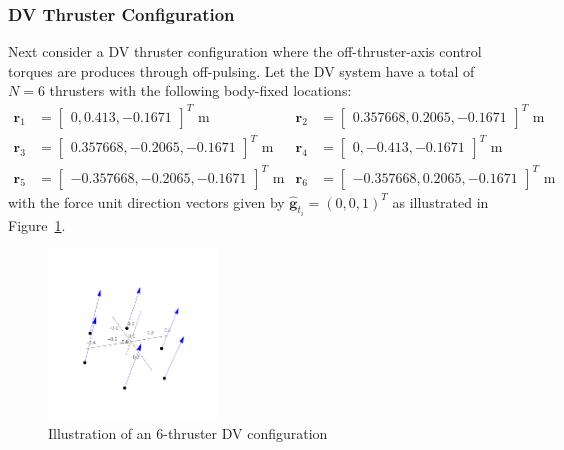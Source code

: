 \subsubsection{DV Thruster Configuration}
Next consider a DV thruster configuration where the off-thruster-axis control torques are produces through off-pulsing.  Let the DV system have a total of $N = 6$ thrusters with the following body-fixed locations:
\begin{align*}
	\label{eq:th:loc}
	\bm r_{1} &= \begin{bmatrix} 0, 0.413, -0.1671  \end{bmatrix}^{T} \text{ m}
	& 
	\bm r_{2} &= \begin{bmatrix} 0.357668, 0.2065, -0.1671  \end{bmatrix}^{T} \text{ m}
	\\
	\bm r_{3} &= \begin{bmatrix} 0.357668, -0.2065, -0.1671 \end{bmatrix}^{T}	 \text{ m}
	&
	\bm r_{4} &= \begin{bmatrix} 0, -0.413, -0.1671  \end{bmatrix}^{T} \text{ m}
	\\
	\bm r_{5} &= \begin{bmatrix} -0.357668, -0.2065, -0.1671  \end{bmatrix}^{T}	 \text{ m}
	&
	\bm r_{6} &= \begin{bmatrix} -0.357668, 0.2065, -0.1671 \end{bmatrix}^{T} \text{ m}
\end{align*}
with the force unit direction vectors given by $\hat{\bm g}_{t_{i}} = (0,0,1)^{T}$ as illustrated in Figure~\ref{fig:6ThrConfig}.
\begin{figure}[t]
	\centerline{
	\includegraphics[width=0.4\textwidth]{Figures/dvThrConfig}
	}
	\caption{Illustration of an 6-thruster DV configuration}
	\label{fig:6ThrConfig}
\end{figure}


